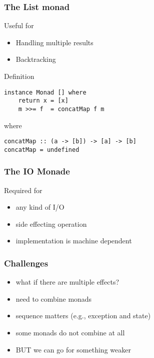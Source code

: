 \documentclass{beamer}
\begin{document}
\begin{frame}[fragile]
  \frametitle{The List monad}
  \begin{block}{Useful for}
                \begin{itemize}         
                        \item Handling multiple results
                        \item Backtracking
                \end{itemize}   
                \end{block}     
\pause
\begin{block}{Definition}
\begin{verbatim}
instance Monad [] where
    return x = [x]
    m >>= f  = concatMap f m
\end{verbatim}  
\end{block}
where 
\begin{verbatim}
concatMap :: (a -> [b]) -> [a] -> [b]
concatMap = undefined
\end{verbatim}
\end{frame}             

\begin{frame}[fragile]
  \frametitle{The IO Monade}
  \begin{block}{Required for}
  \begin{itemize}
        \item any kind of I/O
        \item side effecting operation
        \item implementation is machine dependent
  \end{itemize}
  \end{block}
\end{frame}

\begin{frame}
  \frametitle{Challenges}
  \begin{itemize}[<+->]
  \item what if there are multiple effects?
  \item need to combine monads
  \item sequence matters (e.g., exception and state)
  \item some monads do not combine at all
  \item BUT we can go for something weaker
  \end{itemize}
  
\end{frame}
\end{document}
